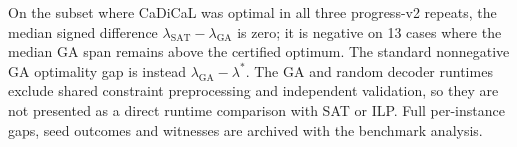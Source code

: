 \begin{table}[htbp]
\centering\small
\caption{Fixed-budget GA and random-order comparison by family.}
\label{tab:ga-baseline}

\end{table}

On the subset where CaDiCaL was optimal in all three progress-v2 repeats,
the median signed difference $\lambda_{\mathrm{SAT}}-\lambda_{\mathrm{GA}}$
is zero; it is negative on 13 cases where the median GA span remains above
the certified optimum. The standard nonnegative GA optimality gap is instead
$\lambda_{\mathrm{GA}}-\lambda^*$. The GA and random decoder runtimes exclude
shared constraint preprocessing and independent validation, so they are not
presented as a direct runtime comparison with SAT or ILP. Full per-instance
gaps, seed outcomes and witnesses are archived with the benchmark analysis.
\FloatBarrier
